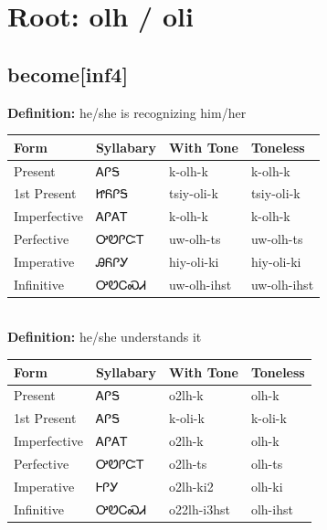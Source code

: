 \documentclass{article}%
\begin{document}
%
\normalsize%
\section*{Root: olh / oli}%
\subsection*{become[inf4]}%
\textbf{Definition: }%
he/she is recognizing him/her%
\\[0.5em]%
\begin{tabular}{|l|l|l|l|}%
\hline%
\textbf{Form}&\textbf{Syllabary}&\textbf{With Tone}&\textbf{Toneless}\\%
\hline%
Present&ᎪᎵᎦ&k{-}olh{-}k&k{-}olh{-}k\\%
1st Present&ᏥᏲᎵᎦ&tsiy{-}oli{-}k&tsiy{-}oli{-}k\\%
Imperfective&ᎪᎵᎪᎢ&k{-}olh{-}k&k{-}olh{-}k\\%
Perfective&ᎤᏬᎵᏨᎢ&uw{-}olh{-}ts&uw{-}olh{-}ts\\%
Imperative&ᎯᏲᎵᎩ&hiy{-}oli{-}ki&hiy{-}oli{-}ki\\%
Infinitive&ᎤᏬᏟᏍᏗ&uw{-}olh{-}ihst&uw{-}olh{-}ihst\\%
\hline%
\end{tabular}%
\\[1em]%
\textbf{Definition: }%
he/she understands it%
\\[0.5em]%
\begin{tabular}{|l|l|l|l|}%
\hline%
\textbf{Form}&\textbf{Syllabary}&\textbf{With Tone}&\textbf{Toneless}\\%
\hline%
Present&ᎪᎵᎦ&o2lh{-}k&olh{-}k\\%
1st Present&ᎪᎵᎦ&k{-}oli{-}k&k{-}oli{-}k\\%
Imperfective&ᎪᎵᎪᎢ&o2lh{-}k&olh{-}k\\%
Perfective&ᎤᏬᎵᏨᎢ&o2lh{-}ts&olh{-}ts\\%
Imperative&ᎰᎵᎩ&o2lh{-}ki2&olh{-}ki\\%
Infinitive&ᎤᏬᏟᏍᏗ&o22lh{-}i3hst&olh{-}ihst\\%
\hline%
\end{tabular}%
\\[1em]%
\end{document}
